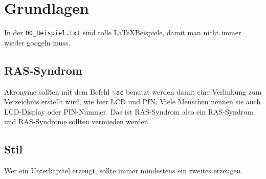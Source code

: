 \chapter{Grundlagen}\label{ch:grundlagen}
In der \texttt{00\_Beispiel.txt} sind tolle \LaTeX Beispiele, damit man nicht immer wieder googeln muss.

\section{RAS-Syndrom}\label{sec:ras-syndrom}
Akronyme sollten mit dem Befehl \texttt{$\backslash$ac} benutzt werden damit eine Verlinkung zum Verzeichnis erstellt wird, wie hier \ac{LCD} und \ac{PIN}. Viele Menschen nennen sie auch \ac{LCD}-Display oder \ac{PIN}-Nummer. Das ist RAS-Syndrom also ein \ac{RAS}-Syndrom und \ac{RAS}-Syndrome sollten vermieden werden.

\section{Stil}\label{sec:stil}
Wer ein Unterkapitel erzeugt, sollte immer mindestens ein zweites erzeugen.